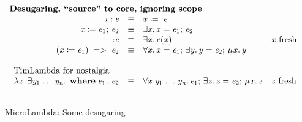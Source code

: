 \documentclass[acmsmall,review,dvipsnames]{acmart}
\newcommand{\Varid}[1]{\mathit{#1}}
\begin{document}
\begin{figure}
$
\begin{array}{l}
  \text{\bf Desugaring, ``source'' to core, ignoring scope} \\
  \begin{array}{rcll}
    \ensuremath{\Varid{x}\mathbin{:}\Varid{e}} & \equiv & \ensuremath{\Varid{x}\mathrel{\coloneqq}\mathbin{:}\Varid{e}} \\
    \ensuremath{\Varid{x}\mathrel{\coloneqq}\Varid{e}_{\mathrm{1}};\,\Varid{e}_{\mathrm{2}}} & \equiv & \ensuremath{\exists\Varid{x}.\,\Varid{x}\mathrel{=}\Varid{e}_{\mathrm{1}};\,\Varid{e}_{\mathrm{2}}} \\
    \ensuremath{\mathbin{:}\Varid{e}} & \equiv & \ensuremath{\exists\Varid{x}.\,\Varid{e}(\Varid{x})} & \text{\ensuremath{\Varid{x}} fresh} \\
    \ensuremath{(\Varid{x}\mathrel{\coloneqq}\Varid{e}_{\mathrm{1}})\;=>\;\Varid{e}_{\mathrm{2}}} & \equiv & \ensuremath{\forall\Varid{x}.\,\Varid{x}\mathrel{=}\Varid{e}_{\mathrm{1}};\,\exists\Varid{y}.\,\Varid{y}\mathrel{=}\Varid{e}_{\mathrm{2}};\,\mu\hspace{0.03em}\Varid{x}.\,\Varid{y}} \\
   \\
   \multicolumn{4}{l}{\text{TimLambda for nostalgia}} \\
    \ensuremath{\lambda\Varid{x}.\,\exists\Varid{y}_{\mathrm{1}}\;\!\ldots\!\;\Varid{y}_{\Varid{n}}.\,\;\mathbf{where}\;\Varid{e}_{\mathrm{1}}\;\! .\;\Varid{e}_{\mathrm{2}}} & \equiv &
    \ensuremath{\forall\Varid{x}\;\Varid{y}_{\mathrm{1}}\;\!\ldots\!\;\Varid{y}_{\Varid{n}}.\,\Varid{e}_{\mathrm{1}};\,\exists\Varid{z}.\,\Varid{z}\mathrel{=}\Varid{e}_{\mathrm{2}};\,\mu\hspace{0.03em}\Varid{x}.\,\Varid{z}} & \text{\ensuremath{\Varid{z}} fresh} \\
    \\
  \end{array} \\
\end{array}
$
\caption{MicroLambda: Some desugaring}
\label{fig:micro-desugar}
\end{figure}
\end{document}
